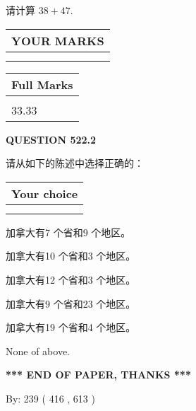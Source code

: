 \documentclass{ctexart}
\begin{document}
  
 
请计算 $ %
38 +  %
47 $.
 

 

 
  
\vspace{0.2in}
  
\noindent\begin{tabular}{|l|}
\hline
 YOUR MARKS  \\
\hline
 \\ 
 \\ 
\hline
\end{tabular}
\hspace{0.05in} \begin{tabular}{|l|}
\hline
 Full Marks  \\
\hline
 \\ 
33.33 \\
\hline
\end{tabular}
{\textbf{\Large{QUESTION
522.2 
}}}
  
  
请从如下的陈述中选择正确的：
  
  
\noindent\hspace{3.0in} \begin{tabular}{|l|}
\hline
Your choice \\
\hline
 \\ 
 \\ 
\hline
\end{tabular}
  
  
 
 
加拿大有7 个省和9 个地区。
 
 
加拿大有10 个省和3 个地区。
 
 
加拿大有12 个省和3 个地区。
 
 
加拿大有9 个省和23 个地区。
 
 
加拿大有19 个省和4 个地区。
 
 
 None of above.
 
 
   
   
 \vspace{0.2in}
 
   
   
   
   
\vspace{1.0in} 
{\textbf{\large{ *** END OF PAPER, THANKS *** }}} 
   
   
\hspace{1.0in} By: 
 239 ( 416 ,  613 )
   
\end{document}
